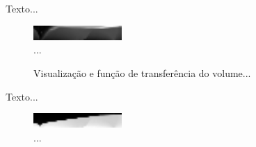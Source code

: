 	Texto...
	
\begin{figure}[h]
	\centering
	\includegraphics[width=0.3\textwidth]{images/r_box_so_slice}
	\caption{...}
\end{figure}

\begin{figure}[h]
	\centering
	\caption{Visualização e função de transferência do volume...}
	\label{fig:r_box_so}
\end{figure}

Texto...

\begin{figure}[h]
	\centering
	\includegraphics[width=0.3\textwidth]{images/r_box_sg_slice}
	\caption{...}
\end{figure}

